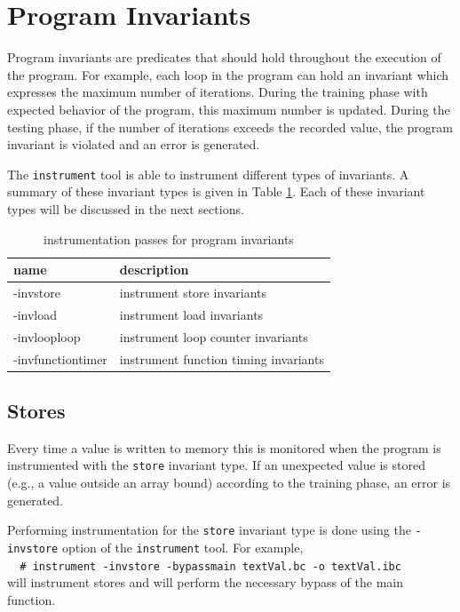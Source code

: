 \section{Program Invariants}

	Program invariants are predicates that should hold throughout the execution of the program.
	For example, each loop in the program can hold an invariant which expresses the maximum number of iterations.
	During the training phase with expected behavior of the program, this maximum number is updated.
	During the testing phase, if the number of iterations exceeds the recorded value, 
	the program invariant is violated and an error is generated.

	The \verb|instrument| tool is able to instrument different types of invariants.
	A summary of these invariant types is given in Table \ref{t:programInvariants}.
	Each of these invariant types will be discussed in the next sections.

	\begin{table}
		\begin{center}
		\begin{tabular}{l|l}
			name & description \\
			\hline
			-invstore         & instrument store invariants \\
			-invload          & instrument load invariants \\
			-invlooploop      & instrument loop counter invariants \\
			-invfunctiontimer & instrument function timing invariants \\
		\end{tabular}
		\caption{instrumentation passes for program invariants}
		\label{t:programInvariants}
		\end{center}
	\end{table}


\subsection{Stores}

		Every time a value is written to memory this is monitored when the program is instrumented
		with the \verb|store| invariant type.
		If an unexpected value is stored (e.g., a value outside an array bound) according to the training phase,
		an error is generated.
	
		Performing instrumentation for the \verb|store| invariant type is done using the 
		\verb|-invstore| option of the \verb|instrument| tool.
		For example,\\
		\verb|  # instrument -invstore -bypassmain textVal.bc -o textVal.ibc|\\
		will instrument stores and will perform the necessary bypass of the main function.

